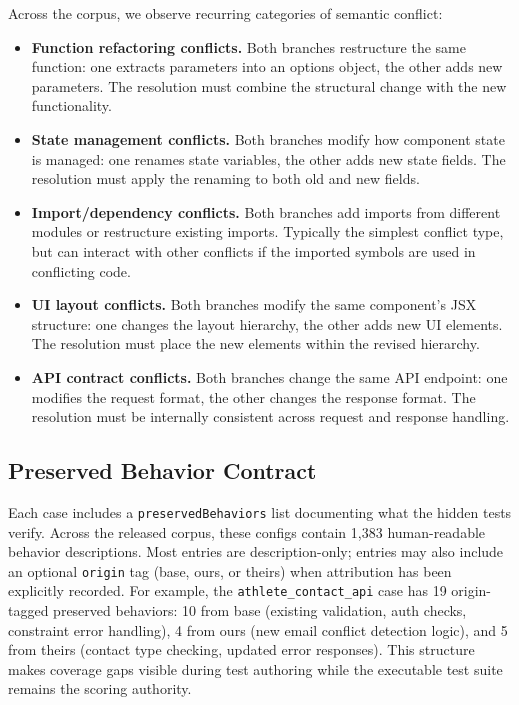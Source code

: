 \documentclass[11pt,letterpaper]{article}
\begin{document}
Across the corpus, we observe recurring categories of semantic conflict:

\begin{itemize}[leftmargin=2em]
\item \textbf{Function refactoring conflicts.} Both branches restructure the same function: one extracts parameters into an options object, the other adds new parameters. The resolution must combine the structural change with the new functionality.

\item \textbf{State management conflicts.} Both branches modify how component state is managed: one renames state variables, the other adds new state fields. The resolution must apply the renaming to both old and new fields.

\item \textbf{Import/dependency conflicts.} Both branches add imports from different modules or restructure existing imports. Typically the simplest conflict type, but can interact with other conflicts if the imported symbols are used in conflicting code.

\item \textbf{UI layout conflicts.} Both branches modify the same component's JSX structure: one changes the layout hierarchy, the other adds new UI elements. The resolution must place the new elements within the revised hierarchy.

\item \textbf{API contract conflicts.} Both branches change the same API endpoint: one modifies the request format, the other changes the response format. The resolution must be internally consistent across request and response handling.
\end{itemize}

\subsection{Preserved Behavior Contract}

Each case includes a \texttt{preservedBehaviors} list documenting what the hidden tests verify. Across the released corpus, these configs contain 1{,}383 human-readable behavior descriptions. Most entries are description-only; entries may also include an optional \texttt{origin} tag (base, ours, or theirs) when attribution has been explicitly recorded. For example, the \texttt{athlete\_contact\_api} case has 19 origin-tagged preserved behaviors: 10 from base (existing validation, auth checks, constraint error handling), 4 from ours (new email conflict detection logic), and 5 from theirs (contact type checking, updated error responses). This structure makes coverage gaps visible during test authoring while the executable test suite remains the scoring authority.
\end{document}
